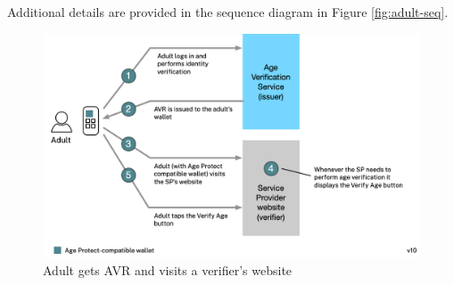 \documentclass[11pt, oneside]{article}   	%
\begin{document}
Additional details are provided in the sequence diagram in Figure \ref{fig:adult-seq}. 

\begin{figure}
	\includegraphics[width=\textwidth]{./images/adult.png}
	\caption{Adult gets AVR and visits a verifier's website}
	\label{fig:adult}
\end{figure}
\end{document}
